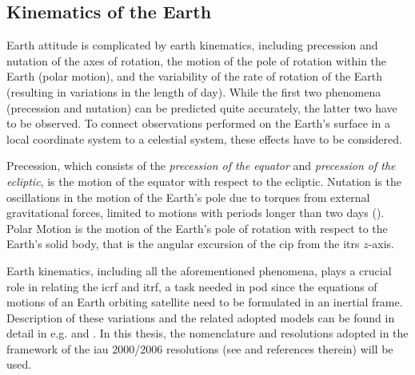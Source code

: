 \subsection{Kinematics of the Earth}\label{ssec:earth-attitude}

Earth attitude is complicated by earth kinematics, including precession and nutation 
of the axes of rotation, the motion of the pole of rotation within the Earth (polar 
motion), and the variability of the rate of rotation of the Earth (resulting in variations 
in the length of day). While the first two phenomena (precession and nutation) can be 
predicted quite accurately, the latter two have to be observed. To connect observations 
performed on the Earth's surface in a local coordinate system to a celestial system, 
these effects have to be considered.

Precession, which consists of the \emph{precession of the equator} and 
\emph{precession of the ecliptic}, is the motion of the equator with respect to 
the ecliptic. Nutation is the oscillations in the motion of the Earth's pole due 
to torques from external gravitational forces, limited to motions with periods longer 
than two days (\cite{Gurfil2018}). Polar Motion is the motion of the Earth's pole of 
rotation with respect to the Earth's solid body, that is the angular excursion of 
the \gls{cip} from the \gls{itrs} $z$-axis.

Earth kinematics, including all the aforementioned phenomena, plays a crucial role in 
relating the \gls{icrf} and \gls{itrf}, a task needed in \gls{pod} since the equations 
of motions of an Earth orbiting satellite need to be formulated in an inertial frame.
Description of these variations and the related adopted models can be found in detail 
in e.g. \cite{Gurfil2018} and \cite{Urban2013}. In this thesis, the nomenclature and 
resolutions adopted in the framework of the \gls{iau} 2000/2006 resolutions 
(see \cite{iers2010} and references therein) will be used.
